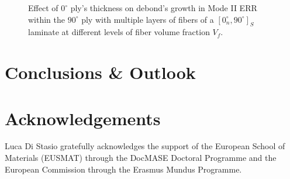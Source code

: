 \documentclass[review]{elsarticle}
\begin{document}
\begin{figure}[!h]
\caption{Effect of $0^{\circ}$ ply's thickness on debond's growth in Mode II ERR within the $90^{\circ}$ ply with multiple layers of fibers of a $\left[0^{\circ}_{n}, 90^{\circ}\right]_{S}$ laminate at different levels of fiber volume fraction $V_{f}$.}\label{fig:sideabovefibersthicknessMII}
\end{figure}

\section{Conclusions \& Outlook}

\section*{Acknowledgements}

Luca Di Stasio gratefully acknowledges the support of the European School of Materials (EUSMAT) through the DocMASE Doctoral Programme and the European Commission through the Erasmus Mundus Programme.


\end{document}
